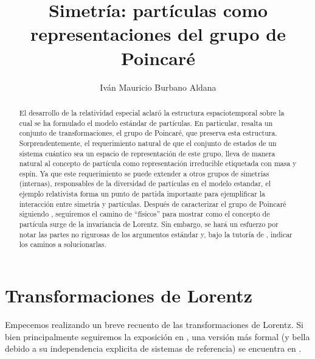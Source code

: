 \documentclass[11pt]{article}
\title{Simetría: partículas como representaciones del grupo de Poincaré}
\author{Iván Mauricio Burbano Aldana}
\affil{Universidad de los Andes}
\begin{document}
\maketitle

\begin{abstract}
El desarrollo de la relatividad especial aclaró la estructura espaciotemporal sobre la cual se ha formulado el modelo estándar de partículas. En particular, resalta un conjunto de transformaciones, el grupo de Poincaré, que preserva esta estructura. Sorprendentemente, el requerimiento natural de que el conjunto de estados de un sistema cuántico sea un espacio de representación de este grupo, lleva de manera natural al concepto de partícula como representación irreducible etiquetada con masa y espín\cite{Wigner1939}. Ya que este requerimiento se puede extender a otros grupos de simetrías (internas), responsables de la diversidad de partículas en el modelo estandar, el ejemplo relativista forma un punto de partida importante para ejemplificar la interacción entre simetría y partículas. Después de caracterizar el grupo de Poincaré siguiendo \cite{Scheck2010}, seguiremos el camino de ``físicos''\cite{Haag1992}\cite{Weinberg1995} para mostrar como el concepto de partícula surge de la invariancia de Lorentz. Sin embargo, se hará un esfuerzo por notar las partes no rigurosas de los argumentos estándar y, bajo la tutoría de \cite{Straumann2008}, indicar los caminos a solucionarlas.  
\end{abstract}

\section{Transformaciones de Lorentz}

Empecemos realizando un breve recuento de las transformaciones de Lorentz. Si bien principalmente seguiremos la exposición en \cite{Scheck2010}, una versión más formal (y bella debido a su independencia explicita de sistemas de referencia) se encuentra en \cite{Matolcsi1993}.
\end{document}
